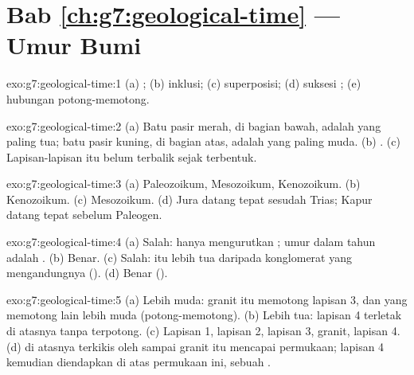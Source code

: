 \section*{Bab \ref{ch:g7:geological-time} --- Umur Bumi}

\begin{solution}{exo:g7:geological-time:1}
(a) ; (b) inklusi; (c) superposisi; (d) suksesi ;
(e) hubungan potong-memotong.
\end{solution}

\begin{solution}{exo:g7:geological-time:2}
(a) Batu pasir merah, di bagian bawah, adalah yang paling tua; batu pasir
kuning, di bagian atas, adalah yang paling muda. (b) .
(c) Lapisan-lapisan itu belum terbalik sejak terbentuk.
\end{solution}

\begin{solution}{exo:g7:geological-time:3}
(a) Paleozoikum, Mesozoikum, Kenozoikum. (b) Kenozoikum. (c) Mesozoikum.
(d) Jura datang tepat sesudah Trias; Kapur datang tepat sebelum Paleogen.
\end{solution}

\begin{solution}{exo:g7:geological-time:4}
(a) Salah:  hanya mengurutkan ; umur dalam tahun
adalah . (b) Benar. (c) Salah:  itu lebih tua
daripada konglomerat yang mengandungnya (). (d) Benar
().
\end{solution}

\begin{solution}{exo:g7:geological-time:5}
(a) Lebih muda: granit itu memotong lapisan 3, dan  yang memotong
 lain lebih muda (potong-memotong). (b) Lebih tua: lapisan 4 terletak
di atasnya tanpa terpotong. (c) Lapisan 1, lapisan 2, lapisan 3, granit,
lapisan 4. (d)  di atasnya terkikis oleh  sampai granit itu
mencapai permukaan; lapisan 4 kemudian diendapkan di atas permukaan 
ini, sebuah .
\end{solution}


